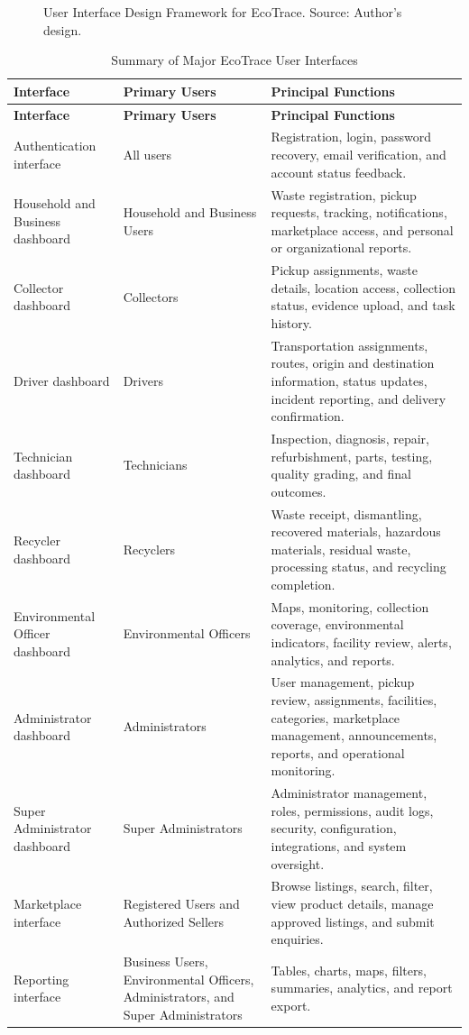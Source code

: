 \begin{figure}[H]
  \centering
  \caption{User Interface Design Framework for EcoTrace. Source: Author's design.}
  \label{fig:ui-framework}
\end{figure}

\begin{longtable}{@{}p{3.6cm}p{3.4cm}p{6.2cm}@{}}
\caption{Summary of Major EcoTrace User Interfaces} \label{tab:ui-summary} \\
\toprule \textbf{Interface} & \textbf{Primary Users} & \textbf{Principal Functions} \\ \midrule
\endfirsthead
\toprule \textbf{Interface} & \textbf{Primary Users} & \textbf{Principal Functions} \\ \midrule
\endhead
Authentication interface & All users & Registration, login, password recovery, email verification, and account status feedback. \\
Household and Business dashboard & Household and Business Users & Waste registration, pickup requests, tracking, notifications, marketplace access, and personal or organizational reports. \\
Collector dashboard & Collectors & Pickup assignments, waste details, location access, collection status, evidence upload, and task history. \\
Driver dashboard & Drivers & Transportation assignments, routes, origin and destination information, status updates, incident reporting, and delivery confirmation. \\
Technician dashboard & Technicians & Inspection, diagnosis, repair, refurbishment, parts, testing, quality grading, and final outcomes. \\
Recycler dashboard & Recyclers & Waste receipt, dismantling, recovered materials, hazardous materials, residual waste, processing status, and recycling completion. \\
Environmental Officer dashboard & Environmental Officers & Maps, monitoring, collection coverage, environmental indicators, facility review, alerts, analytics, and reports. \\
Administrator dashboard & Administrators & User management, pickup review, assignments, facilities, categories, marketplace management, announcements, reports, and operational monitoring. \\
Super Administrator dashboard & Super Administrators & Administrator management, roles, permissions, audit logs, security, configuration, integrations, and system oversight. \\
Marketplace interface & Registered Users and Authorized Sellers & Browse listings, search, filter, view product details, manage approved listings, and submit enquiries. \\
Reporting interface & Business Users, Environmental Officers, Administrators, and Super Administrators & Tables, charts, maps, filters, summaries, analytics, and report export. \\
\bottomrule
\end{longtable}

